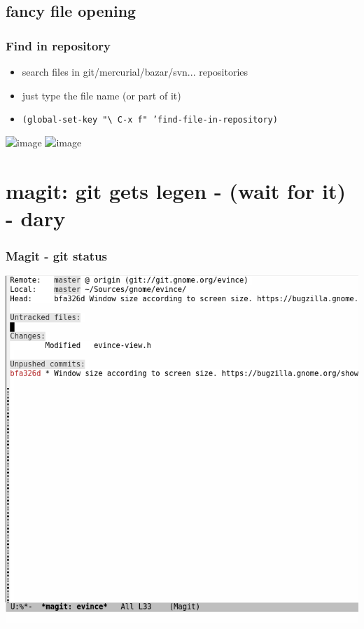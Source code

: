 \documentclass{beamer}
\begin{document}
\subsection{fancy file opening}
\begin{frame}[t]
\frametitle{Find in repository}
\begin{itemize}[<+->]
\item search files in git/mercurial/bazar/svn... repositories
\item just type the file name (or part of it)
\item \small \texttt{(global-set-key "\textbackslash\,C-x f" 'find-file-in-repository)}
\end{itemize}
\vspace{0.5cm}
\includegraphics<4->[width=\textwidth]{images/find_in_repo_1.png}
\vspace{0.5cm}
\includegraphics<5->[width=\textwidth]{images/find_in_repo_2.png}
\end{frame}

\section{magit: git gets legen - (wait for it) - dary}
\begin{frame}
\frametitle{Magit - git status}
\centering
\includegraphics[height=0.9\textheight]{images/magit_status.png}
\end{frame}
\end{document}
